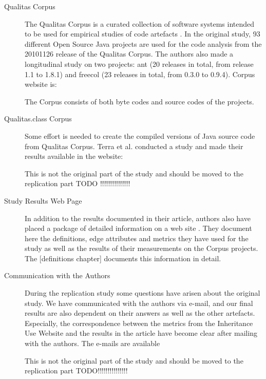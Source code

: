 \documentclass{uvamscse}
\begin{document}
\begin{description}

\item[Qualitas Corpus] 
The Qualitas Corpus is a curated collection of software systems intended to be used for empirical studies of code artefacts \cite{QualitasCorpus:APSEC:2010}. In the original study, 93 different Open Source Java projects are used for the code analysis from the 20101126 release of the Qualitas Corpus. The authors also made a longitudinal study on two projects: ant (20 releases in total, from release 1.1 to 1.8.1) and freecol (23 releases in total, from 0.3.0 to 0.9.4). Corpus website is: \cite{QualitasCorpusWeb}

The Corpus consists of both byte codes and source codes of the projects.

\item[Qualitas.class Corpus]
Some effort is needed to create the compiled versions of Java source code from Qualitas Corpus. Terra et al. conducted a study \cite{qualitas.class} and made their results available in the website: \cite{qualitas.classCorpusWeb}

This is not the original part of the study and should be moved to the replication part TODO !!!!!!!!!!!!!!!


\item[Study Results Web Page]
In addition to the results documented in their article, authors also have placed a package of detailed information on a web site \cite{InheritanceUseWeb}. They document here the definitions, edge attributes and metrics they have used for the study as well as the results of their measurements on the Corpus projects. The [definitions chapter] documents this information in detail.

\item[Communication with the Authors] 
During the replication study some questions have arisen about the original study. We have communicated with the authors via e-mail, and our final results are also dependent on their answers as well as the other artefacts. Especially, the correspondence between the metrics from the Inheritance Use Website \cite{InheritanceUseWeb} and the results in the article \cite{QualitasCorpus:APSEC:2010} have become clear after mailing with the authors. The e-mails are available  

This is not the original part of the study and should be moved to the replication part TODO!!!!!!!!!!!!!!!


\end{description}
\end{document}
